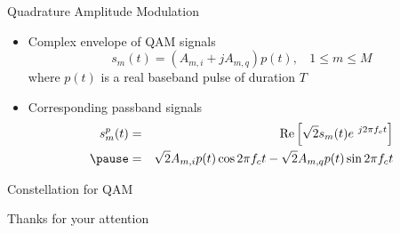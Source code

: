 \documentclass[t]{beamer}
\renewcommand\Re{\operatorname{Re}}
\begin{document}
\begin{frame}{Quadrature Amplitude Modulation}
  \footnotesize
  \begin{itemize}
    \item Complex envelope of QAM signals
      \begin{equation*}
        s_m(t) = (A_{m,i} + jA_{m,q})p(t), \ \ \ \ 1 \leq m \leq M
      \end{equation*}
      where $p(t)$ is a real baseband pulse of duration $T$
    \pause
    \item Corresponding passband signals
      \begin{eqnarray*}
        s_m^p(t) & = & \Re\left[\sqrt{2}s_m(t)e^{\ j2\pi f_c t}\right] \\
                 \pause
                 & = & \sqrt{2}A_{m,i}p(t) \cos 2\pi f_c t  - \sqrt{2}A_{m,q}p(t) \sin 2\pi f_c t 
      \end{eqnarray*}
  \end{itemize}
  \normalsize
\end{frame}

\begin{frame}{Constellation for QAM}
  \footnotesize
  \begin{figure}
    \centering
  \end{figure}
  \normalsize
\end{frame}

\begin{frame}{}
\vfill
\begin{center}
Thanks for your attention
\end{center}
\vfill
\end{frame}
\end{document}
